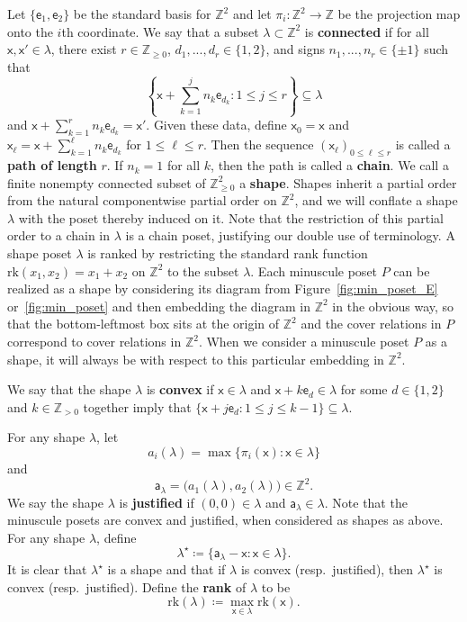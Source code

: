 \documentclass[12pt]{amsart}
\newcommand{\x}{\ensuremath{\mathsf{x}}}
\newcommand{\e}{\ensuremath{\mathsf{e}}}
\newcommand{\aaa}{\ensuremath{\mathsf{a}}}
\theoremstyle{definition}
\theoremstyle{remark}
\numberwithin{equation}{section}
\newcommand{\rank}{\ensuremath{\mathrm{rk}}}
\begin{document}
Let $\{ \e_1, \e_2 \}$ be the standard basis for $\mathbb{Z}^{2}$ and let $\pi_i : \mathbb{Z}^{2} \to \mathbb{Z}$ be the projection map onto the $i$th coordinate. We say that a subset $\lambda \subset \mathbb{Z}^{2}$ is {\bf connected} if for all $\x,\x' \in \lambda$, there exist $r \in \mathbb{Z}_{\geq 0}$, $d_1,...,d_r \in \{1, 2 \}$, and signs $n_1,...,n_r \in \{ \pm 1 \}$ such that 
\[\left\{ \x + \sum_{k=1}^j n_k \e_{d_k} :  1\leq j \leq r \right\} \subseteq \lambda\]
 and $\x + \sum_{k=1}^r n_k \e_{d_k} = \x'$. Given these data, define $\x_0 = \x$ and $\x_\ell = \x + \sum_{k=1}^\ell n_k \e_{d_k}$ for $1 \leq \ell \leq r$. Then the sequence $\left( \x_\ell  \right)_{0 \leq \ell \leq r}$ is called a {\bf path of length} $r$. If $n_k = 1$ for all $k$, then the path is called a {\bf chain}. We call a finite nonempty connected subset of $\mathbb{Z}_{\geq 0}^2$ a {\bf shape}.  Shapes inherit a partial order from the natural componentwise partial order on $\mathbb{Z}^2$, and we will conflate a shape $\lambda$ with the poset thereby induced on it. Note that the restriction of this partial order to a chain in $\lambda$ is a chain poset, justifying our double use of terminology. A shape poset $\lambda$ is ranked by restricting the standard rank function $\text{rk}(x_1,x_2) = x_1 + x_2$ on $\mathbb{Z}^2$ to the subset $\lambda$. Each minuscule poset $P$ can be realized as a shape by considering its diagram from Figure~\ref{fig:min_poset_E} or~\ref{fig:min_poset} and then embedding the diagram in $\mathbb{Z}^2$ in the obvious way, so that the bottom-leftmost box sits at the origin of $\mathbb{Z}^2$ and the cover relations in $P$ correspond to cover relations in $\mathbb{Z}^2$. When we consider a minuscule poset $P$ as a shape, it will always be with respect to this particular embedding in $\mathbb{Z}^2$.

We say that the shape $\lambda$ is {\bf convex} if $\x\in \lambda$ and $\x + k  \e_d \in \lambda $ for some $d \in \{1, 2\}$ and $k \in \mathbb{Z}_{> 0}$ together imply  that $\{\x + j \e_d : 1 \leq j \leq k-1 \} \subseteq \lambda.$

For any shape $\lambda$, let \[a_i(\lambda) = \max \{ \pi_i(\x) \colon \x \in \lambda\}\] and \[\aaa_\lambda = \big(a_1(\lambda),a_{2}(\lambda)\big) \in \mathbb{Z}^2.\] We say the shape $\lambda$ is {\bf justified} if $(0,0) \in \lambda$ and $\aaa_{\lambda} \in \lambda$. Note that the minuscule posets are convex and justified, when considered as shapes as above. For any shape $\lambda$, define 
\[
\lambda^\star \coloneqq \lbrace \aaa_\lambda - \x: \x \in \lambda \rbrace.
\] It is clear that $\lambda^{\star}$ is a shape and that if $\lambda$ is convex (resp.\ justified), then $\lambda^\star$ is convex (resp.\ justified).  Define the {\bf rank} of $\lambda$ to be
\[ 
\rank(\lambda) \coloneqq \max_{\x \in \lambda} \rank(\x).
\]
\end{document}
